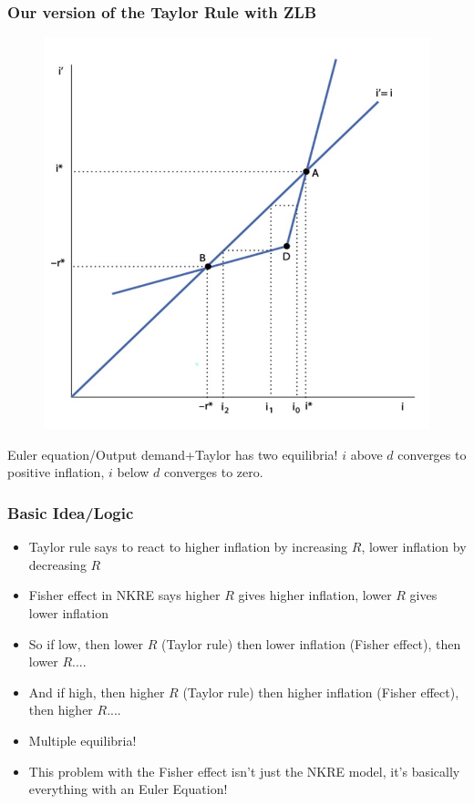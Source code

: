 \documentclass{beamer}
\begin{document}
\begin{frame}
\frametitle[alignment=center]{Our version of the Taylor Rule with ZLB}
\begin{figure}
\centering
\includegraphics[scale=0.5]{Figures/W_Fig_15pt12.png}
\end{figure}
Euler equation/Output demand+Taylor has two equilibria! $i$ above $d$ converges to positive inflation, $i$ below $d$ converges to zero.
\end{frame}

\begin{frame}
\frametitle[alignment=center]{Basic Idea/Logic}
\begin{itemize}
\item Taylor rule says to react to higher inflation by increasing $R$, lower inflation by decreasing $R$
\bigskip
\item  Fisher effect in NKRE says higher $R$ gives higher inflation, lower $R$ gives lower inflation
\bigskip
\item So if low, then lower $R$ (Taylor rule) then lower inflation (Fisher effect), then lower $R$....
\bigskip
\item And if high, then higher $R$ (Taylor rule) then higher inflation (Fisher effect), then higher $R$....
\bigskip
\item Multiple equilibria!
\bigskip
\item This problem with the Fisher effect isn't just the NKRE model, it's basically everything with an Euler Equation!
\end{itemize}
\end{frame}
\end{document}

